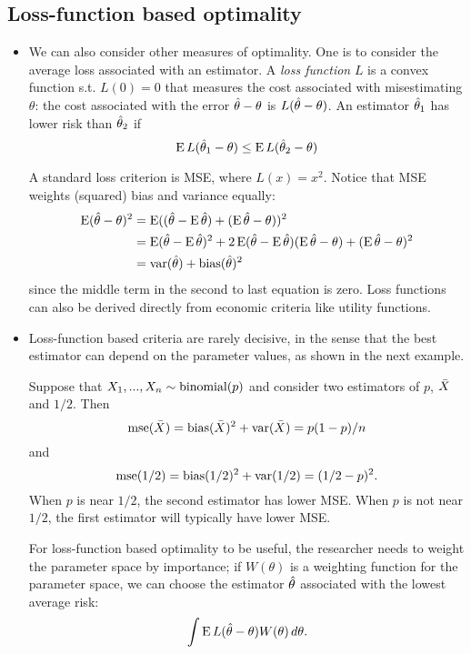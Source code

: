 \subsection{Loss-function based optimality}

\begin{itemize}[leftmargin=0pt]

\item We can also consider other measures of optimality.  One is to
  consider the average loss associated with an estimator.  A
  \emph{loss function} $L$ is a convex function s.t. $L(0) = 0$ that
  measures the cost associated with misestimating $\theta$: the cost
  associated with the error $\hat{\theta} - \theta$ is $L(\hat{\theta} - \theta)$.  An estimator
  $\hat{\theta}_1$ has lower risk than $\hat{\theta}_2$ if
  \begin{equation*}
    \operatorname{E} L(\hat{\theta}_1 - \theta) \leq \operatorname{E} L(\hat{\theta}_2 - \theta)
  \end{equation*}
  
  A standard loss criterion is MSE, where $L(x) = x^2$.  Notice that
  MSE weights (squared) bias and variance equally:
  \begin{align*}
    \operatorname{E} (\hat{\theta} - \theta)^2 &= \operatorname{E}((\hat{\theta} - \operatorname{E} \hat{\theta}) + (\operatorname{E} \hat{\theta} - \theta))^2 \\
    &= \operatorname{E}(\hat{\theta} - \operatorname{E} \hat{\theta})^2 + 2 \operatorname{E} (\hat{\theta} - \operatorname{E} \hat{\theta}) (\operatorname{E} \hat{\theta} - \theta) + (\operatorname{E} \hat{\theta} - \theta)^2 \\
    &= \operatorname{var}(\hat{\theta}) + \operatorname{bias}(\hat{\theta})^2
  \end{align*}
  since the middle term in the second to last equation is zero.  Loss
  functions can also be derived directly from economic criteria like
  utility functions.

\item Loss-function based criteria are rarely decisive, in the sense
  that the best estimator can depend on the parameter values, as shown
  in the next example.
  \begin{ex}
    Suppose that $X_1,...,X_n \sim \operatorname{binomial}(p)$ and consider two
    estimators of $p$, $\bar{X}$ and $1/2$.  Then
    \begin{equation*}
      \operatorname{mse}(\bar{X}) = \operatorname{bias}(\bar{X})^2 + \operatorname{var}(\bar{X}) = p(1-p)/n
    \end{equation*}
    and
    \begin{equation*}
      \operatorname{mse}(1/2) = \operatorname{bias}(1/2)^2 + \operatorname{var}(1/2) = (1/2 - p)^2.
    \end{equation*}
    When $p$ is near $1/2$, the second estimator has lower MSE.  When
    $p$ is not near $1/2$, the first estimator will typically have
    lower MSE.
  \end{ex}

  For loss-function based optimality to be useful, the researcher
  needs to weight the parameter space by importance; if $W(\theta)$ is a
  weighting function for the parameter space, we can choose the
  estimator $\hat{\theta}$ associated with the lowest average risk:
  \begin{equation*}
    \int \operatorname{E} L(\hat{\theta} - \theta) W(\theta) \,d\theta.
  \end{equation*}

\end{itemize}

